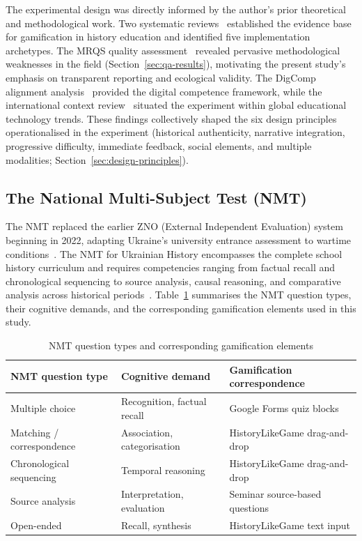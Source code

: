 The experimental design was directly informed by the author's prior theoretical and methodological work. Two systematic reviews~\cite{KorniienkoSemerikov2024, Korniienko2025aredu} established the evidence base for gamification in history education and identified five implementation archetypes. The MRQS quality assessment~\cite{Korniienko2025mrqs} revealed pervasive methodological weaknesses in the field (Section~\ref{sec:qa-results}), motivating the present study's emphasis on transparent reporting and ecological validity. The DigComp alignment analysis~\cite{Titova2025cte} provided the digital competence framework, while the international context review~\cite{Korniienko2025cte} situated the experiment within global educational technology trends. These findings collectively shaped the six design principles operationalised in the experiment (historical authenticity, narrative integration, progressive difficulty, immediate feedback, social elements, and multiple modalities; Section~\ref{sec:design-principles}).

\subsection{The National Multi-Subject Test (NMT)}

The NMT replaced the earlier ZNO (External Independent Evaluation) system beginning in 2022, adapting Ukraine's university entrance assessment to wartime conditions~\cite{MON}. The NMT for Ukrainian History encompasses the complete school history curriculum and requires competencies ranging from factual recall and chronological sequencing to source analysis, causal reasoning, and comparative analysis across historical periods~\cite{Lokshyna2018302}. Table~\ref{tab:nmt-format} summarises the NMT question types, their cognitive demands, and the corresponding gamification elements used in this study.

\begin{table}[!h]
\centering
\caption{NMT question types and corresponding gamification elements}
\label{tab:nmt-format}
\small
\begin{tabular}{p{3.5cm}p{4cm}p{5.5cm}}
\hline
\textbf{NMT question type} & \textbf{Cognitive demand} & \textbf{Gamification correspondence} \\
\hline
Multiple choice & Recognition, factual recall & Google Forms quiz blocks \\
Matching / correspondence & Association, categorisation & HistoryLikeGame drag-and-drop \\
Chronological sequencing & Temporal reasoning & HistoryLikeGame drag-and-drop \\
Source analysis & Interpretation, evaluation & Seminar source-based questions \\
Open-ended & Recall, synthesis & HistoryLikeGame text input \\
\hline
\end{tabular}
\end{table}

